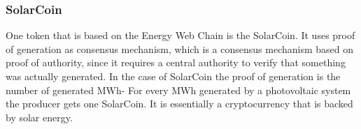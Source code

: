\subsubsection{SolarCoin}\label{subsubsec:solarcoin}
One token that is based on the Energy Web Chain is the SolarCoin.
It uses proof of generation as consensus mechanism, which is a consensus mechanism based on proof of authority, since it requires a central authority to verify that something was actually generated.
In the case of SolarCoin the proof of generation is the number of generated MWh-
For every MWh generated by a photovoltaic system the producer gets one SolarCoin.
It is essentially a cryptocurrency that is backed by solar energy.\cite{solarcoin-save-the-planet}